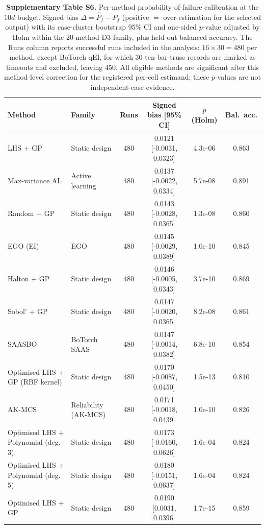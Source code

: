\begin{table}[htbp]
\centering
\caption{\textbf{Supplementary Table S6.} Per-method probability-of-failure calibration at the $10d$ budget. Signed bias $\Delta=\widehat{P}_f-P_f$ (positive $=$ over-estimation for the selected output) with its case-cluster bootstrap 95\% CI and one-sided $p$-value adjusted by Holm within the 20-method D3 family, plus held-out balanced accuracy. The Runs column reports successful runs included in the analysis: $16\times30=480$ per method, except BoTorch qEI, for which 30 ten-bar-truss records are marked as timeouts and excluded, leaving 450. All \NumDThreeNTested{} eligible methods are significant after this method-level correction for the registered per-cell estimand; these $p$-values are not independent-case evidence.}
\label{tab:si_d3_per_method}
\SITableFont
\setlength{\tabcolsep}{4pt}
\begin{tabular}{@{}llcccc@{}}
\toprule
\textbf{Method} & \textbf{Family} & \textbf{Runs} & \textbf{Signed bias [95\% CI]} & \textbf{$p$ (Holm)} & \textbf{Bal.\ acc.} \\
\midrule
LHS + GP & Static design & 480 & 0.0121 [-0.0031, 0.0323] & 4.3e-06 & 0.863 \\
Max-variance AL & Active learning & 480 & 0.0137 [-0.0022, 0.0334] & 5.7e-08 & 0.891 \\
Random + GP & Static design & 480 & 0.0143 [-0.0028, 0.0365] & 1.3e-08 & 0.860 \\
EGO (EI) & EGO & 480 & 0.0145 [-0.0029, 0.0389] & 1.0e-10 & 0.845 \\
Halton + GP & Static design & 480 & 0.0146 [-0.0005, 0.0343] & 3.7e-10 & 0.869 \\
Sobol' + GP & Static design & 480 & 0.0147 [-0.0020, 0.0365] & 8.2e-08 & 0.861 \\
SAASBO & BoTorch SAAS & 480 & 0.0147 [-0.0014, 0.0382] & 6.8e-10 & 0.854 \\
Optimised LHS + GP (RBF kernel) & Static design & 480 & 0.0170 [-0.0087, 0.0450] & 1.5e-13 & 0.810 \\
AK-MCS & Reliability (AK-MCS) & 480 & 0.0171 [-0.0018, 0.0439] & 1.0e-10 & 0.826 \\
Optimised LHS + Polynomial (deg. 3) & Static design & 480 & 0.0173 [-0.0160, 0.0626] & 1.6e-04 & 0.824 \\
Optimised LHS + Polynomial (deg. 5) & Static design & 480 & 0.0180 [-0.0151, 0.0637] & 1.6e-04 & 0.824 \\
Optimised LHS + GP & Static design & 480 & 0.0190 [0.0031, 0.0396] & 1.7e-15 & 0.859 \\

\end{tabular}
\end{table}

